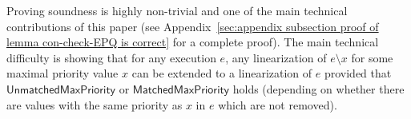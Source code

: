 Proving soundness is highly non-trivial and one of the main technical contributions of this paper (see Appendix~\ref{sec:appendix subsection proof of lemma con-check-EPQ is correct} for a complete proof). The main technical difficulty is showing that for any execution $e$, any linearization of $e\setminus x$ for some maximal priority value $x$ can be extended to a linearization of $e$ provided that $\mathsf{UnmatchedMaxPriority}$ or $\mathsf{MatchedMaxPriority}$ holds (depending on whether there are values with the same priority as $x$ in $e$ which are not removed).
%
%
%
%
%
%



